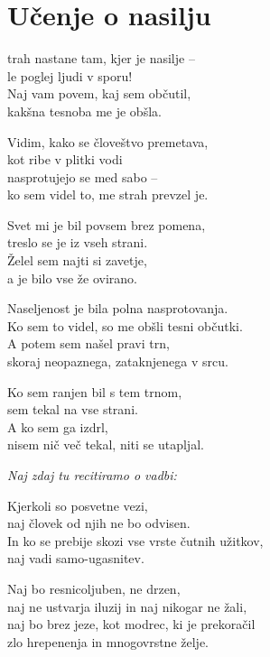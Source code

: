 \cleartorecto
{}
\chapter{Učenje o nasilju}

trah nastane tam, kjer je nasilje --\\
le poglej ljudi v sporu!\\
Naj vam povem, kaj sem občutil,\\
kakšna tesnoba me je obšla.

Vidim, kako se človeštvo premetava,\\
kot ribe v plitki vodi\\
nasprotujejo se med sabo --\\
ko sem videl to, me strah prevzel je.

\clearpage

Svet mi je bil povsem brez pomena,\\
treslo se je iz vseh strani.\\
Želel sem najti si zavetje,\\
a je bilo vse že ovirano.

Naseljenost je bila polna nasprotovanja.\\
Ko sem to videl, so me obšli tesni občutki.\\
A potem sem našel pravi trn,\\
skoraj neopaznega, zataknjenega v srcu.

Ko sem ranjen bil s tem trnom,\\
sem tekal na vse strani.\\
A ko sem ga izdrl,\\
nisem nič več tekal, niti se utapljal.

\emph{Naj zdaj tu recitiramo o vadbi:}

Kjerkoli so posvetne vezi,\\
naj človek od njih ne bo odvisen.\\
In ko se prebije skozi vse vrste čutnih užitkov,\\
naj vadi samo-ugasnitev.

Naj bo resnicoljuben, ne drzen,\\
naj ne ustvarja iluzij in naj nikogar ne žali,\\
naj bo brez jeze, kot modrec, ki je prekoračil\\
zlo hrepenenja in mnogovrstne želje.

